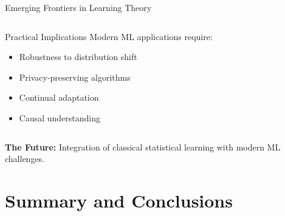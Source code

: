 \documentclass[aspectratio=169,11pt]{beamer}
\begin{document}
\begin{frame}{Emerging Frontiers in Learning Theory}
\begin{columns}
\begin{column}{0.5\textwidth}
\vspace{0.3cm}
\begin{block}{Practical Implications}
Modern ML applications require:
\begin{itemize}
\item Robustness to distribution shift
\item Privacy-preserving algorithms
\item Continual adaptation
\item Causal understanding
\end{itemize}
\end{block}
\end{column}
\end{columns}

\textbf{The Future:} Integration of classical statistical learning with modern ML challenges.
\end{frame}

\section{Summary and Conclusions}
\end{document}
